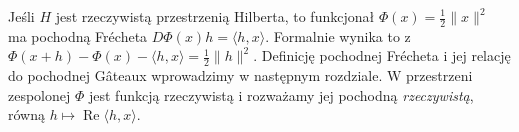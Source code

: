 \begin{uwaga}
\label{rem:gateaux-bridge13}
Jeśli $H$ jest rzeczywistą przestrzenią Hilberta, to funkcjonał
$\Phi(x)=\frac12\|x\|^2$ ma pochodną Frécheta
$D\Phi(x)h=\langle h,x\rangle$. Formalnie wynika to z
$\Phi(x+h)-\Phi(x)-\langle h,x\rangle=\frac12\|h\|^2$.
Definicję pochodnej Frécheta i jej relację do pochodnej Gâteaux
wprowadzimy w następnym rozdziale. W przestrzeni zespolonej
$\Phi$ jest funkcją rzeczywistą i rozważamy jej pochodną
\emph{rzeczywistą}, równą $h\mapsto\operatorname{Re}\langle h,x\rangle$.
\end{uwaga}
